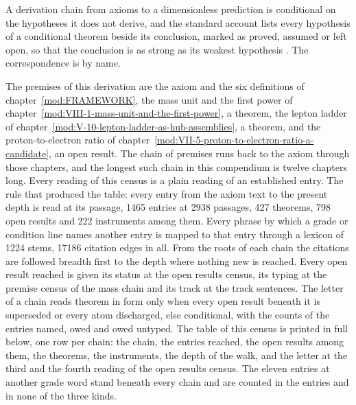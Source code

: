 \begin{chbridge}
A derivation chain from axioms to a dimensionless prediction is conditional on the hypotheses it does not derive, and the standard account lists every hypothesis of a conditional theorem beside its conclusion, marked as proved, assumed or left open, so that the conclusion is as strong as its weakest hypothesis \cite{Weinberg1995}. The correspondence is by name.
\end{chbridge}
\begin{chproof}[instrument]
The premises of this derivation are the axiom and the six definitions of chapter~\ref{mod:FRAMEWORK}, the mass unit and the first power of chapter~\ref{mod:VIII-1-mass-unit-and-the-first-power}, a theorem, the lepton ladder of chapter~\ref{mod:V-10-lepton-ladder-as-hub-assemblies}, a theorem, and the proton-to-electron ratio of chapter~\ref{mod:VII-5-proton-to-electron-ratio-a-candidate}, an open result. The chain of premises runs back to the axiom through those chapters, and the longest such chain in this compendium is twelve chapters long.
Every reading of this census is a plain reading of an established entry. The rule that produced the table: every entry from the axiom text to the present depth is read at its passage, 1465 entries at 2938 passages, 427 theorems, 798 open results and 222 instruments among them. Every phrase by which a grade or condition line names another entry is mapped to that entry through a lexicon of 1224 stems, 17186 citation edges in all. From the roots of each chain the citations are followed breadth first to the depth where nothing new is reached. Every open result reached is given its status at the open results census, its typing at the premise census of the mass chain and its track at the track sentences. The letter of a chain reads theorem in form only when every open result beneath it is superseded or every atom discharged, else conditional, with the counts of the entries named, owed and owed untyped.
The table of this census is printed in full below, one row per chain: the chain, the entries reached, the open results among them, the theorems, the instruments, the depth of the walk, and the letter at the third and the fourth reading of the open results census. The eleven entries at another grade word stand beneath every chain and are counted in the entries and in none of the three kinds.

\end{chproof}
